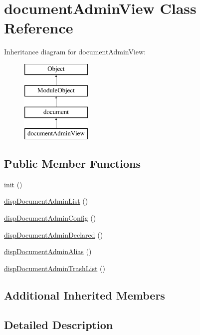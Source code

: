 \hypertarget{classdocumentAdminView}{\section{document\-Admin\-View Class Reference}
\label{classdocumentAdminView}
}
Inheritance diagram for document\-Admin\-View\-:\begin{figure}[H]
\begin{center}
\leavevmode
\includegraphics[height=4.000000cm]{classdocumentAdminView}
\end{center}
\end{figure}
\subsection*{Public Member Functions}
\begin{DoxyCompactItemize}
\item 
\hyperlink{classdocumentAdminView_aed09978af62e856f18f80e8573968c3c}{init} ()
\item 
\hyperlink{classdocumentAdminView_a522a3fbd85960249d098fd1b8e5a0117}{disp\-Document\-Admin\-List} ()
\item 
\hyperlink{classdocumentAdminView_a4b41049c99341fbb4a782da55d3737e5}{disp\-Document\-Admin\-Config} ()
\item 
\hyperlink{classdocumentAdminView_ad94b3d2db90d0912e4f24a1efb9bff46}{disp\-Document\-Admin\-Declared} ()
\item 
\hyperlink{classdocumentAdminView_a7f9210670150395b7ef8c6209ce0ac53}{disp\-Document\-Admin\-Alias} ()
\item 
\hyperlink{classdocumentAdminView_a677a59c8ecf38161449f397e85f22fa4}{disp\-Document\-Admin\-Trash\-List} ()
\end{DoxyCompactItemize}
\subsection*{Additional Inherited Members}


\subsection{Detailed Description}



